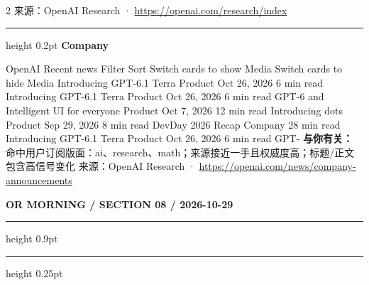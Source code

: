\documentclass[10.5pt]{ctexart}
\begin{document}
\begin{multicols}{2}
{\footnotesize\color{ormuted} 来源：OpenAI Research · \url{https://openai.com/research/index}}
\vspace{2mm}
\hrule height 0.2pt
\vspace{2mm}
{\large\bfseries Company}\par
OpenAI Recent news Filter Sort Switch cards to show Media Switch cards to hide Media Introducing GPT-6.1 Terra Product Oct 26, 2026 6 min read Introducing GPT-6.1 Terra Product Oct 26, 2026 6 min read GPT-6 and Intelligent UI for everyone Product Oct 7, 2026 12 min read Introducing dots Product Sep 29, 2026 8 min read DevDay 2026 Recap Company 28 min read Introducing GPT-6.1 Terra Product Oct 26, 2026 6 min read GPT-
\textbf{与你有关：} 命中用户订阅版面：ai、research、math；来源接近一手且权威度高；标题/正文包含高信号变化
{\footnotesize\color{ormuted} 来源：OpenAI Research · \url{https://openai.com/news/company-announcements}}
\end{multicols}
\newpage
{\small\bfseries OR MORNING / SECTION 08 / 2026-10-29}
\vspace{2mm}
\hrule height 0.9pt
\vspace{1.5mm}
\hrule height 0.25pt
\vspace{4mm}
\end{document}

